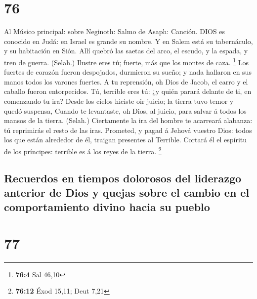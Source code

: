 \hypertarget{section-75}{%
\section{76}\label{section-75}}

 Al Músico principal: sobre Neginoth: Salmo de Asaph:
Canción. DIOS es conocido en Judá: en Israel es grande su nombre.
 Y en Salem está su tabernáculo, y su habitación en Sión.
 Allí quebró las saetas del arco, el escudo, y la espada, y
tren de guerra. (Selah.)  Ilustre eres tú; fuerte, más que
los montes de caza. \footnote{\textbf{76:4} Sal 46,10}  Los
fuertes de corazón fueron despojados, durmieron su sueño; y nada
hallaron en sus manos todos los varones fuertes.  A tu
reprensión, oh Dios de Jacob, el carro y el caballo fueron entorpecidos.
 Tú, terrible eres tú: ¿y quién parará delante de ti, en
comenzando tu ira?  Desde los cielos hiciste oir juicio; la
tierra tuvo temor y quedó suspensa,  Cuando te levantaste,
oh Dios, al juicio, para salvar á todos los mansos de la tierra.
(Selah.)  Ciertamente la ira del hombre te acarreará
alabanza: tú reprimirás el resto de las iras.  Prometed, y
pagad á Jehová vuestro Dios: todos los que están alrededor de él,
traigan presentes al Terrible.  Cortará él el espíritu de
los príncipes: terrible es á los reyes de la tierra. \footnote{\textbf{76:12}
  Éxod 15,11; Deut 7,21}

\hypertarget{recuerdos-en-tiempos-dolorosos-del-liderazgo-anterior-de-dios-y-quejas-sobre-el-cambio-en-el-comportamiento-divino-hacia-su-pueblo}{%
\subsection{Recuerdos en tiempos dolorosos del liderazgo anterior de
Dios y quejas sobre el cambio en el comportamiento divino hacia su
pueblo}\label{recuerdos-en-tiempos-dolorosos-del-liderazgo-anterior-de-dios-y-quejas-sobre-el-cambio-en-el-comportamiento-divino-hacia-su-pueblo}}

\hypertarget{section-76}{%
\section{77}\label{section-76}}

